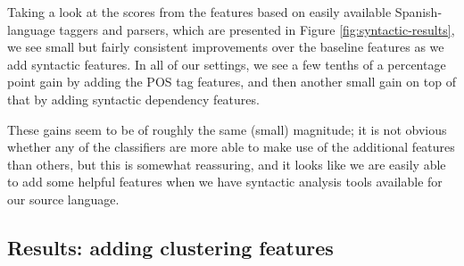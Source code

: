 Taking a look at the scores from the features based on easily available
Spanish-language taggers and parsers, which are presented in Figure
\ref{fig:syntactic-results}, we see small but fairly consistent improvements
over the baseline features as we add syntactic features. In all of our
settings, we see a few tenths of a percentage point gain by adding the POS tag
features, and then another small gain on top of that by adding syntactic
dependency features.

These gains seem to be of roughly the same (small) magnitude; it is not obvious
whether any of the classifiers are more able to make use of the additional
features than others, but this is somewhat reassuring, and it looks like we are
easily able to add some helpful features when we have syntactic analysis tools
available for our source language.

\subsection{Results: adding clustering features}

